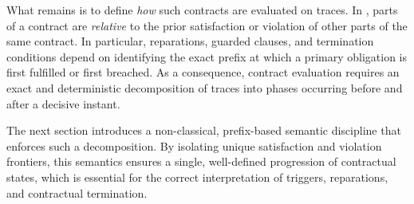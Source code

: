 What remains is to define \emph{how} such contracts are evaluated on traces.
In \cDL, parts of a contract are \emph{relative} to the prior satisfaction or violation of other parts of the same contract.
In particular, reparations, guarded clauses, and termination conditions depend on identifying the exact prefix at which a primary obligation is first fulfilled or first breached.
As a consequence, contract evaluation requires an exact and deterministic decomposition of traces into phases occurring before and after a decisive instant.

The next section introduces a non-classical, prefix-based semantic discipline that enforces such a decomposition.
By isolating unique satisfaction and violation frontiers, this semantics ensures a single, well-defined progression of contractual states, which is essential for the correct interpretation of triggers, reparations, and contractual termination.









